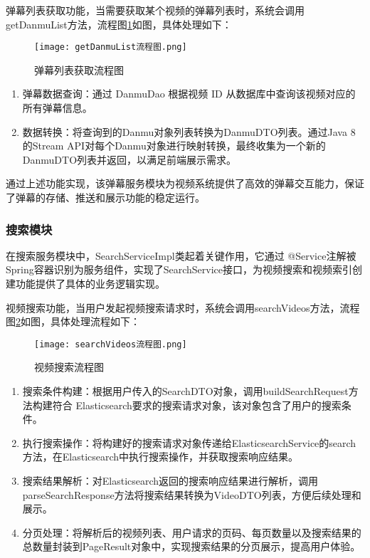 弹幕列表获取功能，当需要获取某个视频的弹幕列表时，系统会调用getDanmuList方法，流程图\ref{弹幕列表获取流程图}如图，具体处理如下：

\begin{figure}[hbt]
    \centering
    \texttt{[image: getDanmuList流程图.png]}
    \caption{弹幕列表获取流程图}
    \label{弹幕列表获取流程图}
\end{figure}


\begin{enumerate}[label=(\arabic*)]
    \item 弹幕数据查询：通过 DanmuDao 根据视频 ID 从数据库中查询该视频对应的所有弹幕信息。
    \item 数据转换：将查询到的Danmu对象列表转换为DanmuDTO列表。通过Java 8的Stream API对每个Danmu对象进行映射转换，最终收集为一个新的DanmuDTO列表并返回，以满足前端展示需求。
\end{enumerate}

通过上述功能实现，该弹幕服务模块为视频系统提供了高效的弹幕交互能力，保证了弹幕的存储、推送和展示功能的稳定运行。
\subsubsection{搜索模块}

在搜索服务模块中，SearchServiceImpl类起着关键作用，它通过 @Service注解被Spring容器识别为服务组件，实现了SearchService接口，为视频搜索和视频索引创建功能提供了具体的业务逻辑实现。

视频搜索功能，当用户发起视频搜索请求时，系统会调用searchVideos方法，流程图\ref{视频搜索流程图}如图，具体处理流程如下：

\begin{figure}[hbt]
    \centering
    \texttt{[image: searchVideos流程图.png]}
    \caption{视频搜索流程图}
    \label{视频搜索流程图}
\end{figure}


\begin{enumerate}[label=(\arabic*)]
    \item 搜索条件构建：根据用户传入的SearchDTO对象，调用buildSearchRequest方法构建符合 Elasticsearch要求的搜索请求对象，该对象包含了用户的搜索条件。
    \item 执行搜索操作：将构建好的搜索请求对象传递给ElasticsearchService的search方法，在Elasticsearch中执行搜索操作，并获取搜索响应结果。
    \item 搜索结果解析：对Elasticsearch返回的搜索响应结果进行解析，调用parseSearchResponse方法将搜索结果转换为VideoDTO列表，方便后续处理和展示。
    \item 分页处理：将解析后的视频列表、用户请求的页码、每页数量以及搜索结果的总数量封装到PageResult对象中，实现搜索结果的分页展示，提高用户体验。
\end{enumerate}

